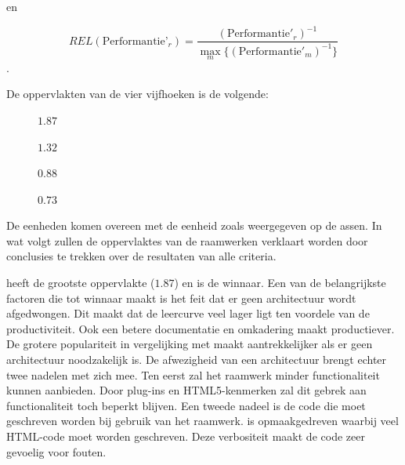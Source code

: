 en

\begin{equation}
  REL(\text{Performantie'}_r)= \frac{\left(\text{Performantie}'_r\right)^{-1}}{\max_{m}\{\left(\text{Performantie}'_m\right)^{-1}\}}
  \label{eq:rel-performantie-final}
\end{equation}.

De oppervlakten van de vier vijfhoeken is de volgende:
\begin{description}
 \item [\jqm{}] $1.87$
 \item [\kendo{}] $1.32$
 \item [\lungo{}] $0.88$
 \item [\st{}] $0.73$
\end{description}

De eenheden komen overeen met de eenheid zoals weergegeven op de assen.
In wat volgt zullen de oppervlaktes van de raamwerken verklaart worden door conclusies te trekken over de resultaten van alle criteria.


\jqm{} heeft de grootste oppervlakte ($1.87$) en is de winnaar.
Een van de belangrijkste factoren die \jqm{} tot winnaar maakt is het feit dat er geen architectuur wordt afgedwongen.
Dit maakt dat de leercurve veel lager ligt ten voordele van de productiviteit.
Ook een betere documentatie en omkadering maakt \jqm{} productiever.
De grotere populariteit in vergelijking met \lungo{} maakt \jqm{} aantrekkelijker als er geen architectuur noodzakelijk is.
De afwezigheid van een architectuur brengt echter twee nadelen met zich mee.
Ten eerst zal het raamwerk minder functionaliteit kunnen aanbieden.
Door plug-ins en HTML5-kenmerken zal dit gebrek aan functionaliteit toch beperkt blijven.
Een tweede nadeel is de code die moet geschreven worden bij gebruik van het \jqm{} raamwerk.
\jqm{} is opmaakgedreven waarbij veel HTML-code moet worden geschreven.
Deze verbositeit maakt de code zeer gevoelig voor fouten. 



